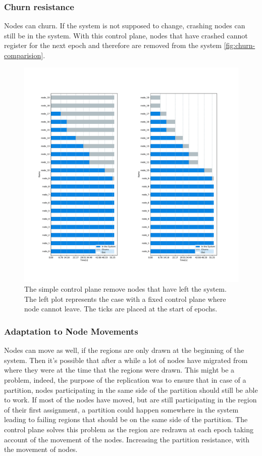\documentclass[a4paper,11pt,oneside]{report}
\begin{document}
\subsubsection{Churn resistance}
Nodes can churn. If the system is not supposed to change, crashing nodes can still be
in the system. With this control plane, nodes that have crashed cannot
register for the next epoch and therefore are removed from the system \autoref{fig:churn-comparision}. 
\begin{figure}[!h] 
\centering
\includegraphics[width=450pt]{figures/ChurnSubplots}
\caption{The simple control plane remove nodes that have left the system. The left plot represents the case with a fixed control plane where node cannot leave. The ticks are placed at the start of epochs.}
\label{fig:churn-comparision}
\end{figure}

\subsubsection{Adaptation to Node Movements}
Nodes can move as well, if the regions are only drawn at the beginning of the
system. Then it's possible that after a while a lot of nodes have migrated from
where they were at the time that the regions were drawn. This might be a
problem, indeed, the purpose of the replication was to ensure that in case of a
partition, nodes participating in the same side of the partition should still
be able to work. If most of the nodes have moved, but are still participating
in the region of their first assignment, a partition could happen somewhere in
the system leading to failing regions that should be on the same side of the
partition. The control plane solves this problem as the region are redrawn at
each epoch taking account of the movement of the nodes. Increasing the
partition resistance, with the movement of nodes.
\end{document}
